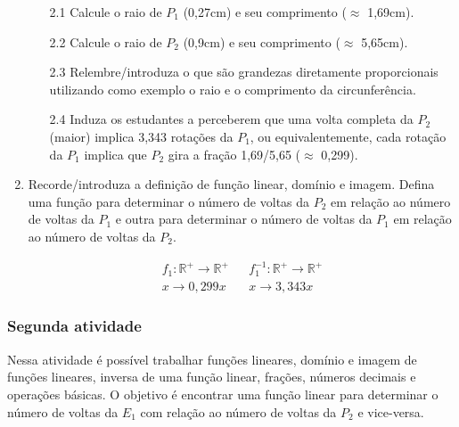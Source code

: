 \documentclass{textolivre-html}
\begin{document}
\begin{enumerate}
    \begin{enumerate}
    \item[2.1] Calcule o raio de $P_1$ (0,27cm) e seu comprimento ($\approx$ 1,69cm).
    \item[2.2] Calcule o raio de $P_2$ (0,9cm) e seu comprimento ($\approx$ 5,65cm).
    \item[2.3] Relembre/introduza o que são grandezas diretamente proporcionais
    utilizando como exemplo o raio e o comprimento da circunferência.
    \item[2.4] Induza os estudantes a perceberem que uma volta completa da $P_2$
    (maior) implica 3,343 rotações da $P_1$, ou equivalentemente, cada rotação
    da $P_1$ implica que $P_2$ gira a fração 1,69/5,65 ($\approx$ 0,299).
    \end{enumerate}

    \item Recorde/introduza a definição de função linear, domínio e imagem.
    Defina uma função para determinar o número de voltas da $P_2$ em relação ao
    número de voltas da $P_1$ e outra para determinar o número de voltas da
    $P_1$ em relação ao número de voltas da $P_2$.

    \begin{align*}
    f_1: \mathbb{R}^{+} \rightarrow \mathbb{R}^{+} && f_{1}^{-1}: \mathbb{R}^{+} \rightarrow \mathbb{R}^{+} \\
    x \rightarrow 0,299x && x \rightarrow 3,343x \nonumber
    \end{align*}

\end{enumerate}



\subsubsection{Segunda atividade}\label{sec-segunda}
Nessa atividade é possível trabalhar funções lineares, domínio e imagem de
funções lineares, inversa de uma função linear, frações, números decimais e
operações básicas. O objetivo é encontrar uma função linear para determinar o
número de voltas da $E_1$ com relação ao número de voltas da $P_2$ e vice-versa.
\end{document}
